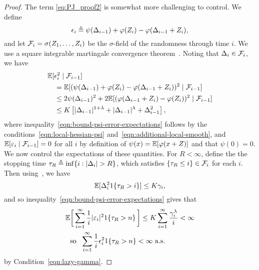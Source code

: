 \begin{proof}
  The term \eqref{eq:PJ_proof2} is somewhat more challenging to control.
  We define
  \begin{equation*}
    \epsilon_i \triangleq \psi(\Delta_{i-1}) + \varphi(Z_i)
    - \varphi(\Delta_{i-1}+Z_i),
  \end{equation*}
  and let
  $\mathcal{F}_i = \sigma(Z_1, \ldots, Z_i)$ be the $\sigma$-field of the randomness
  through time $i$. We use a square integrable martingale convergence
  theorem~\cite[Exercise~5.3.35]{Dembo16}. Noting that
  $\Delta_i \in \mathcal{F}_i$, we have
  \begin{align}
    & \mathbb{E}[\epsilon_i^2 \mid \mathcal{F}_{i-1}] \nonumber \\
    & \quad = \mathbb{E}[(\psi(\Delta_{i-1}) + \varphi(Z_i)
      - \varphi(\Delta_{i-1} + Z_i))^2 \mid \mathcal{F}_{i-1}]
    \nonumber \\
    & \quad  \le 2 \psi(\Delta_{i-1})^2
    + 2 \mathbb{E}[(\varphi(\Delta_{i-1} + Z_i) - \varphi(Z_i))^2 \mid \mathcal{F}_{i-1}]
    \nonumber \\
    & \quad \le
    K \left[|\Delta_{i-1}|^{1 + \lambda}
      + |\Delta_{i-1}|^\lambda
      + \Delta_{i-1}^2 \right],
    \label{eqn:bound-psi-error-expectations}
  \end{align}
  where inequality~\eqref{eqn:bound-psi-error-expectations} follows by the
  conditions~\eqref{eqn:local-hessian-psi}
  and~\eqref{eqn:additional-local-smooth}, and $\mathbb{E}[\varepsilon_i \mid
    \mathcal{F}_{i-1}] = 0$ for all $i$ by definition of $\psi(x) = \mathbb{E}[\varphi(x
    + Z)]$ and that $\psi(0) = 0$.  We now control the expectations of these
  quantities. For $R<\infty$, define the the stopping time $\tau_R \triangleq \inf
  \{i : |\Delta_i| > R\}$, which satisfies $\{\tau_R \le i\} \in \mathcal{F}_i$
  for each $i$. Then using~\cite[Eq.~(A13-A14)]{polyak1992acceleration}, we have
  \begin{equation*}
    \mathbb{E}[\Delta_i^2 1\!\left\{\tau_R > i\right\}] \le K \gamma_i,
  \end{equation*}
  and so inequality~\eqref{eqn:bound-psi-error-expectations} gives that
  \begin{align*}
    & \mathbb{E}\bigg[\sum_{i = 1}^\infty \frac{1}{i}
      |\varepsilon_i|^2 1\!\left\{\tau_R > n\right\} \bigg]
    \le K \sum_{i = 1}^\infty \frac{\gamma_i^\lambda}{i}
    < \infty \\
    & 
    ~~ \mbox{so} ~~
    \sum_{i = 1}^\infty \frac{1}{i}
    \epsilon_i^2 1\!\left\{\tau_R > n\right\} < \infty
    ~ \mbox{a.s.}
  \end{align*}
by Condition~\eqref{eqn:lazy-gamma}. 
%  

\end{proof}
